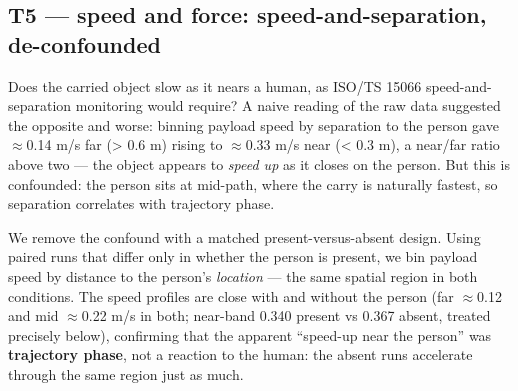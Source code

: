 \documentclass{article}
\begin{document}
\subsection{T5 --- speed and force: speed-and-separation, de-confounded}


Does the carried object slow as it nears a human, as ISO/TS 15066 speed-and-separation monitoring \citep{ref11} would require? A naive reading of the raw data suggested the opposite and worse: binning payload speed by separation to the person gave $\approx$0.14 m/s far (> 0.6 m) rising to $\approx$0.33 m/s near (< 0.3 m), a near/far ratio above two --- the object appears to \emph{speed up} as it closes on the person. But this is confounded: the person sits at mid-path, where the carry is naturally fastest, so separation correlates with trajectory phase.

We remove the confound with a matched present-versus-absent design. Using paired runs that differ only in whether the person is present, we bin payload speed by distance to the person's \emph{location} --- the same spatial region in both conditions. The speed profiles are close with and without the person (far $\approx$0.12 and mid $\approx$0.22 m/s in both; near-band 0.340 present vs 0.367 absent, treated precisely below), confirming that the apparent ``speed-up near the person'' was \textbf{trajectory phase}, not a reaction to the human: the absent runs accelerate through the same region just as much.
\end{document}
